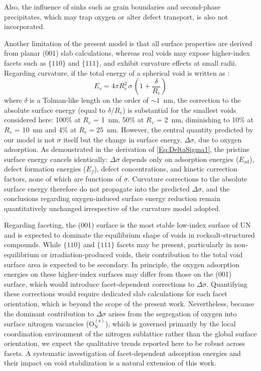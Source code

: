 \documentclass[preprint,12pt,sort&compress]{elsarticle}
\newcommand{\?}{\stackrel{?}{=}}
\begin{document}
Also, the influence of sinks such as grain boundaries and second-phase precipitates, which may trap oxygen or alter defect transport, is also not incorporated.

Another limitation of the present model is that all surface properties are derived from planar (001) slab calculations, whereas real voids may expose higher-index facets such as $\{110\}$ and $\{111\}$, and exhibit curvature effects at small radii. Regarding curvature, if the total energy of a spherical void is written as \cite{Tolman1949,Chhapadia2011,Wang2021}:
\begin{equation}
E_v = 4 \pi R_v^2 \, \sigma \, \left(1 + \frac{\delta}{R_v} \right)    
\end{equation}
where $\delta$ is a Tolman-like length on the order of $\sim 1$~nm, the correction to the absolute surface energy (equal to $\delta/R_v$) is substantial for the smallest voids considered here: 100\% at $R_v$ = 1~nm, 50\% at $R_v$ = 2~nm, diminishing to 10\% at $R_v$ = 10~nm and 4\% at $R_v = 25$~nm. However, the central quantity predicted by our model is not $\sigma$ itself but the change in surface energy, $\Delta\sigma$, due to oxygen adsorption. As demonstrated in the derivation of \cref{Eq:DeltaSigma1}, the pristine surface energy cancels identically: $\Delta\sigma$ depends only on adsorption energies ($E_\mathrm{ad}$), defect formation energies ($E_f$), defect concentrations, and kinetic correction factors, none of which are functions of $\sigma$. Curvature corrections to the absolute surface energy therefore do not propagate into the predicted $\Delta\sigma$, and the conclusions regarding oxygen-induced surface energy reduction remain quantitatively unchanged irrespective of the curvature model adopted.

Regarding faceting, the (001) surface is the most stable low-index surface of UN \cite{Zhukovskii2009SS} and is expected to dominate the equilibrium shape of voids in rocksalt-structured compounds. While $\{110\}$ and $\{111\}$ facets may be present, particularly in non-equilibrium or irradiation-produced voids, their contribution to the total void surface area is expected to be secondary. In principle, the oxygen adsorption energies on these higher-index surfaces may differ from those on the (001) surface, which would introduce facet-dependent corrections to $\Delta\sigma$. Quantifying these corrections would require dedicated slab calculations for each facet orientation, which is beyond the scope of the present work. Nevertheless, because the dominant contribution to $\Delta\sigma$ arises from the segregation of oxygen into surface nitrogen vacancies (O$_\mathrm{N}^{(\mathrm{s})}$), which is governed primarily by the local coordination environment of the nitrogen sublattice rather than the global surface orientation, we expect the qualitative trends reported here to be robust across facets. A systematic investigation of facet-dependent adsorption energies and their impact on void stabilization is a natural extension of this work.
\end{document}
